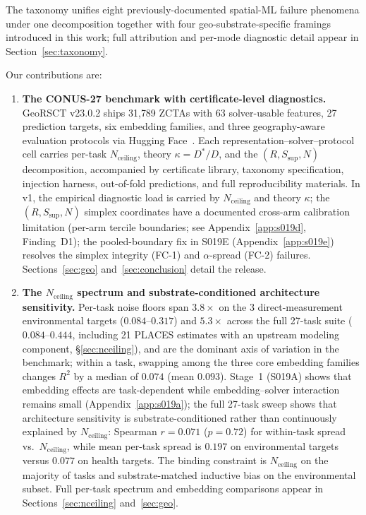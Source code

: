 \documentclass{article}
\begin{document}
The taxonomy unifies eight previously-documented spatial-ML failure phenomena under one decomposition together with four geo-substrate-specific framings introduced in this work; full attribution and per-mode diagnostic detail appear in Section~\ref{sec:taxonomy}.

Our contributions are:
\begin{enumerate}
\item \textbf{The CONUS-27 benchmark with certificate-level diagnostics.} GeoRSCT v23.0.2 ships 31{,}789 ZCTAs with 63 solver-usable features, 27 prediction targets, six embedding families, and three geography-aware evaluation protocols via Hugging Face~\citep{geocert2026}. Each representation--solver--protocol cell carries per-task $N_{\text{ceiling}}$, theory $\kappa = D^*/D$, and the $(R, S_{\text{sup}}, N)$ decomposition, accompanied by certificate library, taxonomy specification, injection harness, out-of-fold predictions, and full reproducibility materials. In v1, the empirical diagnostic load is carried by $N_{\text{ceiling}}$ and theory $\kappa$; the $(R, S_{\text{sup}}, N)$ simplex coordinates have a documented cross-arm calibration limitation (per-arm tercile boundaries; see Appendix~\ref{app:s019d}, Finding~D1); the pooled-boundary fix in S019E (Appendix~\ref{app:s019e}) resolves the simplex integrity (FC-1) and $\alpha$-spread (FC-2) failures. Sections~\ref{sec:geo} and~\ref{sec:conclusion} detail the release.

\item \textbf{The $N_{\text{ceiling}}$ spectrum and substrate-conditioned architecture sensitivity.} Per-task noise floors span $3.8{\times}$ on the 3 direct-measurement environmental targets ($0.084$--$0.317$) and $5.3{\times}$ across the full 27-task suite ($0.084$--$0.444$, including 21 PLACES estimates with an upstream modeling component, \S\ref{sec:nceiling}), and are the dominant axis of variation in the benchmark; within a task, swapping among the three core embedding families changes $R^2$ by a median of $0.074$ (mean $0.093$). Stage~1 (S019A) shows that embedding effects are task-dependent while embedding--solver interaction remains small (Appendix~\ref{app:s019a}); the full 27-task sweep shows that architecture sensitivity is substrate-conditioned rather than continuously explained by $N_{\text{ceiling}}$: Spearman $r = 0.071$ ($p = 0.72$) for within-task spread vs.\ $N_{\text{ceiling}}$, while mean per-task spread is $0.197$ on environmental targets versus $0.077$ on health targets. The binding constraint is $N_{\text{ceiling}}$ on the majority of tasks and substrate-matched inductive bias on the environmental subset. Full per-task spectrum and embedding comparisons appear in Sections~\ref{sec:nceiling} and~\ref{sec:geo}.


\end{enumerate}
\end{document}
